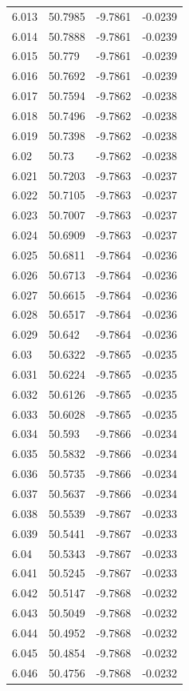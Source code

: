 \begin{tabular}{llll}
6.013 & 50.7985 & -9.7861 & -0.0239 \\
6.014 & 50.7888 & -9.7861 & -0.0239 \\
6.015 & 50.779 & -9.7861 & -0.0239 \\
6.016 & 50.7692 & -9.7861 & -0.0239 \\
6.017 & 50.7594 & -9.7862 & -0.0238 \\
6.018 & 50.7496 & -9.7862 & -0.0238 \\
6.019 & 50.7398 & -9.7862 & -0.0238 \\
6.02 & 50.73 & -9.7862 & -0.0238 \\
6.021 & 50.7203 & -9.7863 & -0.0237 \\
6.022 & 50.7105 & -9.7863 & -0.0237 \\
6.023 & 50.7007 & -9.7863 & -0.0237 \\
6.024 & 50.6909 & -9.7863 & -0.0237 \\
6.025 & 50.6811 & -9.7864 & -0.0236 \\
6.026 & 50.6713 & -9.7864 & -0.0236 \\
6.027 & 50.6615 & -9.7864 & -0.0236 \\
6.028 & 50.6517 & -9.7864 & -0.0236 \\
6.029 & 50.642 & -9.7864 & -0.0236 \\
6.03 & 50.6322 & -9.7865 & -0.0235 \\
6.031 & 50.6224 & -9.7865 & -0.0235 \\
6.032 & 50.6126 & -9.7865 & -0.0235 \\
6.033 & 50.6028 & -9.7865 & -0.0235 \\
6.034 & 50.593 & -9.7866 & -0.0234 \\
6.035 & 50.5832 & -9.7866 & -0.0234 \\
6.036 & 50.5735 & -9.7866 & -0.0234 \\
6.037 & 50.5637 & -9.7866 & -0.0234 \\
6.038 & 50.5539 & -9.7867 & -0.0233 \\
6.039 & 50.5441 & -9.7867 & -0.0233 \\
6.04 & 50.5343 & -9.7867 & -0.0233 \\
6.041 & 50.5245 & -9.7867 & -0.0233 \\
6.042 & 50.5147 & -9.7868 & -0.0232 \\
6.043 & 50.5049 & -9.7868 & -0.0232 \\
6.044 & 50.4952 & -9.7868 & -0.0232 \\
6.045 & 50.4854 & -9.7868 & -0.0232 \\
6.046 & 50.4756 & -9.7868 & -0.0232 \\

\end{tabular}

